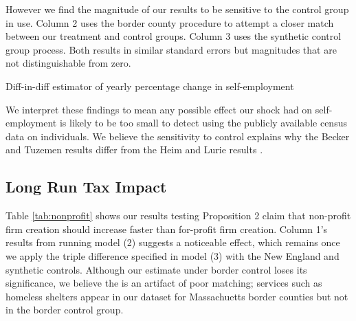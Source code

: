 \documentclass[12pt]{article}
\begin{document}
However we find the magnitude of our results to be sensitive to the control group in use. Column 2 uses the border county procedure to attempt a closer match between our treatment and control groups. Column 3 uses the synthetic control group process. Both results in similar standard errors but magnitudes that are not distinguishable from zero. 
\begin{center}
	\begin{table}[H]
		\centering
			\caption{Diff-in-diff estimator of yearly percentage change in self-employment} 
			
		\label{tab:control}
	\end{table}		
\end{center}
\begin{comment}
\multicolumn{4}{l}{\footnotesize Diff-in-diff model of health care reform from 2000 to 2012 with Massachusetts treated after 2007. }\\
\multicolumn{4}{l}{\footnotesize Maine, Connecticut, Vermont, Rhode Island and New Hampshire used as controls in column (1). }\\
\multicolumn{4}{l}{\footnotesize Column (3) uses a synthetic control model that matches each Massachuetts county pre-trend against}\\
\multicolumn{4}{l}{\footnotesize \space US counties with similar income, age, urban and insurance rate characteristics. }\\
s. 
\end{comment}
We interpret these findings to mean any possible effect our shock had on self-employment is likely to be too small to detect using the publicly available census data on individuals. We believe the sensitivity to control explains why the Becker and Tuzemen \cite{tuzemen} results differ from the Heim and Lurie results \cite{heimLurie}. 

\subsection{Long Run Tax Impact}

Table \ref{tab:nonprofit} shows our results testing Proposition 2 claim that non-profit firm creation should increase faster than for-profit firm creation. Column 1's results from running model (2) suggests a noticeable effect, which remains once we apply the triple difference specified in model (3) with the New England and synthetic controls. Although our estimate under border control loses its significance, we believe the is an artifact of poor matching; services such as homeless shelters appear in our dataset for Massachuetts border counties but not in the border control group. 
\end{document}
